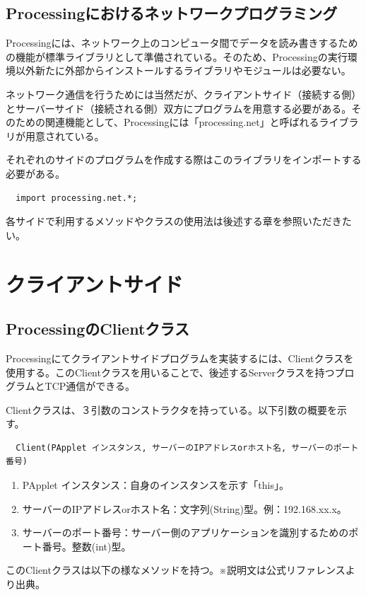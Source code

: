 \documentclass[dvipdfmx]{jsarticle}
\begin{document}
\subsection{Processingにおけるネットワークプログラミング}
Processingには、ネットワーク上のコンピュータ間でデータを読み書きするための機能が標準ライブラリとして準備されている。そのため、Processingの実行環境以外新たに外部からインストールするライブラリやモジュールは必要ない。\par
ネットワーク通信を行うためには当然だが、クライアントサイド（接続する側）とサーバーサイド（接続される側）双方にプログラムを用意する必要がある。そのための関連機能として、Processingには「processing.net」と呼ばれるライブラリが用意されている。\par
それぞれのサイドのプログラムを作成する際はこのライブラリをインポートする必要がある。\par
\begin{verbatim}
  import processing.net.*;
\end{verbatim}
各サイドで利用するメソッドやクラスの使用法は後述する章を参照いただきたい。
\section{クライアントサイド}
\subsection{ProcessingのClientクラス}
Processingにてクライアントサイドプログラムを実装するには、Clientクラスを使用する。このClientクラスを用いることで、後述するServerクラスを持つプログラムとTCP通信ができる。\par
Clientクラスは、３引数のコンストラクタを持っている。以下引数の概要を示す。
\begin{verbatim}
  Client(PApplet インスタンス, サーバーのIPアドレスorホスト名, サーバーのポート番号)
\end{verbatim}
\begin{enumerate}
  \item PApplet インスタンス：自身のインスタンスを示す「this」。
  \item サーバーのIPアドレスorホスト名：文字列(String)型。例：192.168.xx.x。
  \item サーバーのポート番号：サーバー側のアプリケーションを識別するためのポート番号。整数(int)型。
\end{enumerate}
このClientクラスは以下の様なメソッドを持つ。※説明文は公式リファレンスより出典。
\end{document}
